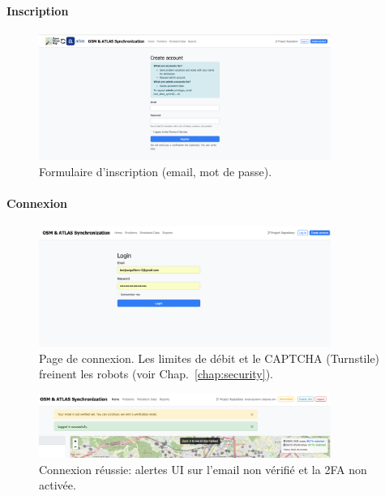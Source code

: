 \paragraph{Inscription}
\begin{figure}[h]
  \centering
  \includegraphics[width=0.85\textwidth]{../figures/chap10/create_account.png}
  \caption{Formulaire d'inscription (email, mot de passe).}
\end{figure}

\paragraph{Connexion}
\begin{figure}[h]
  \centering
  \includegraphics[width=0.85\textwidth]{../figures/chap10/login_page.png}
  \caption{Page de connexion. Les limites de débit et le CAPTCHA (Turnstile) freinent les robots (voir Chap.~\ref{chap:security}).}
\end{figure}

\begin{figure}[h]
  \centering
  \includegraphics[width=0.85\textwidth]{../figures/chap10/login_succesful.png}
  \caption{Connexion réussie: alertes UI sur l'email non vérifié et la 2FA non activée.}
\end{figure}

